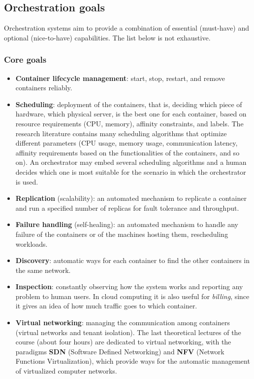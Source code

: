 \subsection{Orchestration goals}

Orchestration systems aim to provide a combination of essential (must-have) and optional (nice-to-have) capabilities. The list below is not exhaustive.

\subsubsection*{Core goals}

\begin{itemize}
\item \textbf{Container lifecycle management}: start, stop, restart, and remove containers reliably.
\item \textbf{Scheduling}: deployment of the containers, that is, deciding which piece of hardware, which physical server, is the best one for each container, based on resource requirements (CPU, memory), affinity constraints, and labels. The research literature contains many scheduling algorithms that optimize different parameters (CPU usage, memory usage, communication latency, affinity requirements based on the functionalities of the containers, and so on). An orchestrator may embed several scheduling algorithms and a human decides which one is most suitable for the scenario in which the orchestrator is used.
\item \textbf{Replication} (scalability): an automated mechanism to replicate a container and run a specified number of replicas for fault tolerance and throughput.
\item \textbf{Failure handling} (self-healing): an automated mechanism to handle any failure of the containers or of the machines hosting them, rescheduling workloads.
\item \textbf{Discovery}: automatic ways for each container to find the other containers in the same network.
\item \textbf{Inspection}: constantly observing how the system works and reporting any problem to human users. In cloud computing it is also useful for \emph{billing}, since it gives an idea of how much traffic goes to which container.
\item \textbf{Virtual networking}: managing the communication among containers (virtual networks and tenant isolation). The last theoretical lectures of the course (about four hours) are dedicated to virtual networking, with the paradigms \textbf{SDN} (Software Defined Networking) and \textbf{NFV} (Network Functions Virtualization), which provide ways for the automatic management of virtualized computer networks.
\end{itemize}

